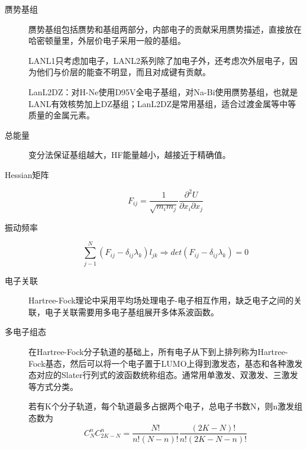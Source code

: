 \documentclass[12pt,a4paper,openany,twoside]{book}
\numberwithin{equation}{section}
\begin{document}
\begin{description}
          \item[赝势基组]
            赝势基组包括赝势和基组两部分，内部电子的贡献采用赝势描述，直接放在哈密顿量里，外层价电子采用一般的基组。

            LANL1只考虑加电子，LANL2系列除了加电子外，还考虑次外层电子，因为他们与价层的能查不明显，而且对成键有贡献。

            LanL2DZ：对H-Ne使用D95V全电子基组，对Na-Bi使用赝势基组，也就是LANL有效核势加上DZ基组；LanL2DZ是常用基组，适合过渡金属等中等质量的金属元素。
        
          \item[总能量] 变分法保证基组越大，HF能量越小，越接近于精确值。
        
          \item[Hessian矩阵]
            \begin{equation}
              F_{ij}=\frac{1}{\sqrt{m_im_j}}\frac{\partial^2 U}{\partial x_i \partial x_j}
            \end{equation}
        
          \item[振动频率]
            \begin{equation}
              \sum_{j-1}^N (F_{ij}-\delta_{ij}\lambda_k)l_{jk}\Rightarrow det(F_{ij}-\delta_{ij}\lambda_{k})=0
            \end{equation}

          \item[电子关联] Hartree-Fock理论中采用平均场处理电子-电子相互作用，缺乏电子之间的关联，电子关联需要用多电子基组展开多体系波函数。
          \item[多电子组态] 在Hartree-Fock分子轨道的基础上，所有电子从下到上排列称为Hartree-Fock基态，然后可以将一个电子置于LUMO上得到激发态，基态和各种激发态对应的Slater行列式的波函数统称组态。通常用单激发、双激发、三激发等方式分类。

            若有K个分子轨道，每个轨道最多占据两个电子，总电子书数N，则n激发组态数为
            \begin{equation}
              C_N^nC_{2K-N}^n=\frac{N!}{n!(N-n)!}\frac{(2K-N)!}{n!(2K-N-n)!}
            \end{equation}


\end{description}
\end{document}
